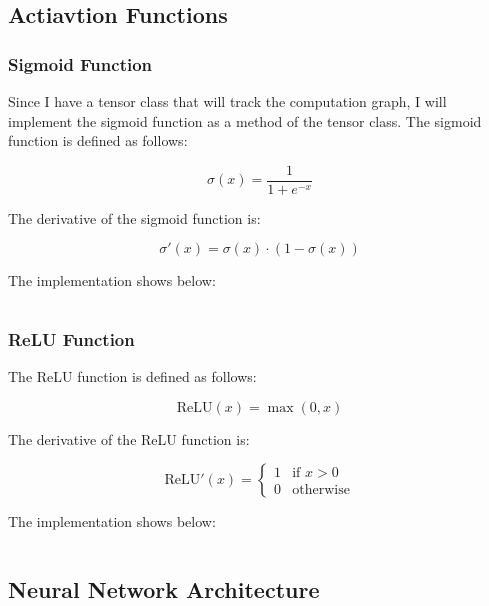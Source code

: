 \subsection{Actiavtion Functions}

\subsubsection{Sigmoid Function}

Since I have a tensor class that will track the computation graph, I will implement the sigmoid function as a method of the tensor class. The sigmoid function is defined as follows:

\begin{equation}
    \sigma(x) = \frac{1}{1 + e^{-x}}
\end{equation}

The derivative of the sigmoid function is:

\begin{equation}
    \sigma'(x) = \sigma(x) \cdot (1 - \sigma(x))
\end{equation}

The implementation shows below:

\inputminted[firstline=23, lastline=37]{python}{../FakeTorch/nn/activation.py}


\subsubsection{ReLU Function}

The ReLU function is defined as follows:

\begin{equation}
    \text{ReLU}(x) = \max(0, x)
\end{equation}

The derivative of the ReLU function is:

\begin{equation}
    \text{ReLU}'(x) = \begin{cases}
        1 & \text{if } x > 0 \\
        0 & \text{otherwise}
    \end{cases}
\end{equation}

The implementation shows below:

\inputminted[firstline=6, lastline=20]{python}{../FakeTorch/nn/activation.py}

\subsection{Neural Network Architecture}



